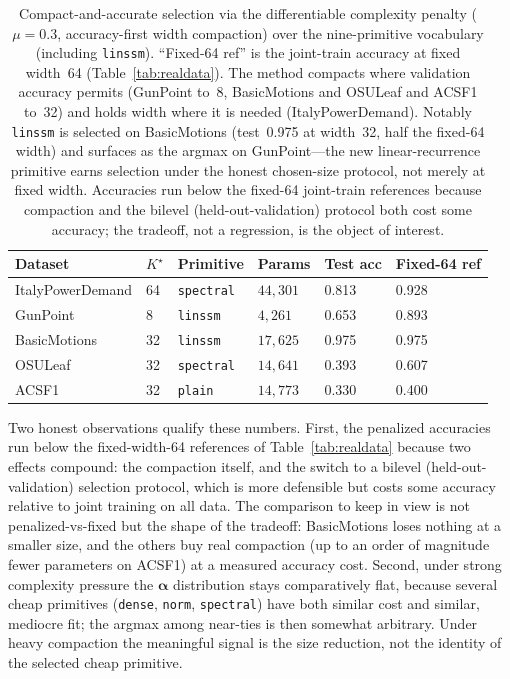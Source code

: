 \documentclass[11pt]{article}
\newcommand{\allowbreakhere}{\discretionary{}{}{}}
\newcommand{\code}[1]{\texttt{\def\_{\char`_\allowbreakhere}#1}}
\newcommand{\alphapar}{\bm{\alpha}}
\begin{document}
\begin{table}[h]
\centering
\small
\renewcommand{\arraystretch}{1.2}
\begin{tabular}{p{3.2cm} p{1.2cm} p{1.8cm} p{2.2cm} p{1.6cm} p{2.0cm}}
\toprule
\textbf{Dataset} & \textbf{$K^\star$} & \textbf{Primitive} & \textbf{Params} & \textbf{Test acc} & \textbf{Fixed-64 ref}\\
\midrule
ItalyPowerDemand & 64 & \code{spectral} & $44{,}301$ & 0.813 & 0.928\\
GunPoint         & 8  & \code{linssm}   & $4{,}261$  & 0.653 & 0.893\\
BasicMotions     & 32 & \code{linssm}   & $17{,}625$ & 0.975 & 0.975\\
OSULeaf          & 32 & \code{spectral} & $14{,}641$ & 0.393 & 0.607\\
ACSF1            & 32 & \code{plain}    & $14{,}773$ & 0.330 & 0.400\\
\bottomrule
\end{tabular}
\caption{Compact-and-accurate selection via the differentiable complexity penalty ($\mu=0.3$,
accuracy-first width compaction) over the nine-primitive vocabulary (including \code{linssm}).
``Fixed-64 ref'' is the joint-train accuracy at fixed width~64 (Table~\ref{tab:realdata}). The
method compacts where validation accuracy permits (GunPoint to~8, BasicMotions and OSULeaf and
ACSF1 to~32) and holds width where it is needed (ItalyPowerDemand). Notably \code{linssm} is
selected on BasicMotions (test~0.975 at width~32, half the fixed-64 width) and surfaces as the
argmax on GunPoint---the new linear-recurrence primitive earns selection under the honest
chosen-size protocol, not merely at fixed width. Accuracies run below the fixed-64 joint-train
references because compaction and the bilevel (held-out-validation) protocol both cost some
accuracy; the tradeoff, not a regression, is the object of interest.}
\label{tab:penalized}
\end{table}

Two honest observations qualify these numbers. First, the penalized accuracies run below the
fixed-width-64 references of Table~\ref{tab:realdata} because two effects compound: the
compaction itself, and the switch to a bilevel (held-out-validation) selection protocol, which
is more defensible but costs some accuracy relative to joint training on all data. The
comparison to keep in view is not penalized-vs-fixed but the shape of the tradeoff:
BasicMotions loses nothing at a smaller size, and the others buy real compaction (up to an
order of magnitude fewer parameters on ACSF1) at a measured accuracy cost. Second, under strong
complexity pressure the $\alphapar$ distribution stays comparatively flat, because several cheap
primitives (\code{dense}, \code{norm}, \code{spectral}) have both similar cost and similar,
mediocre fit; the argmax among near-ties is then somewhat arbitrary. Under heavy compaction the
meaningful signal is the size reduction, not the identity of the selected cheap primitive.
\end{document}
